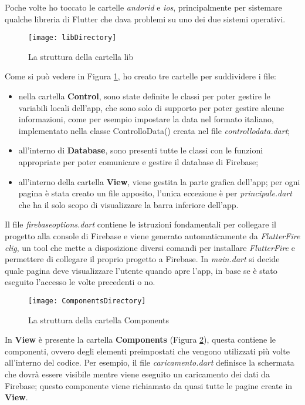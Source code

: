 Poche volte ho toccato le cartelle \emph{andorid} e \emph{ios}, principalmente per sistemare qualche libreria di Flutter che dava problemi su uno dei due sistemi operativi. 
\newpage
\begin{figure}[!h] 
    \centering 
    \texttt{[image: libDirectory]} 
    \caption{La struttura della cartella lib}
    \label{fig:directory-lib}
\end{figure}
Come si può vedere in Figura \ref{fig:directory-lib}, ho creato tre cartelle per suddividere i file:
\begin{itemize}
    \item nella cartella \textbf{Control}, sono state definite le classi per poter gestire le variabili locali dell'app, che sono solo di supporto per poter gestire alcune informazioni, come per esempio impostare la data nel formato italiano, implementato nella classe ControlloData() creata nel file \emph{controllo\textunderscore  data.dart};
    \item all'interno di \textbf{Database}, sono presenti tutte le classi con le funzioni appropriate per poter comunicare e gestire il database di Firebase;
    \item all'interno della cartella \textbf{View}, viene gestita la parte grafica dell'app; per ogni pagina è stata creato un file apposito, l'unica eccezione è per \emph{principale.dart} che ha il solo scopo di visualizzare la barra inferiore dell'app.
\end{itemize}
Il file \emph{firebase\textunderscore options.dart} contiene le istruzioni fondamentali per collegare il progetto alla console di Firebase e viene generato automaticamente da \emph{FlutterFire \gls{clig}\glsfirstoccur}, un tool che mette a disposizione diversi comandi per installare \emph{FlutterFire} e permettere di collegare il proprio progetto a Firebase.\newline
In \emph{main.dart} si decide quale pagina deve visualizzare l'utente quando apre l'app, in base se è stato eseguito l'accesso le volte precedenti o no.
\newpage
\begin{figure}[!h] 
    \centering 
    \texttt{[image: ComponentsDirectory]} 
    \caption{La struttura della cartella Components}
    \label{fig:directory-components}
\end{figure}
In \textbf{View} è presente la cartella \textbf{Components} (Figura \ref{fig:directory-components}), questa contiene le componenti, ovvero degli elementi preimpostati che vengono utilizzati più volte all'interno del codice.\newline
Per esempio, il file \emph{caricamento.dart} definisce la schermata che dovrà essere visibile mentre viene eseguito un caricamento dei dati da Firebase; questo componente viene richiamato da quasi tutte le pagine create in \textbf{View}.

